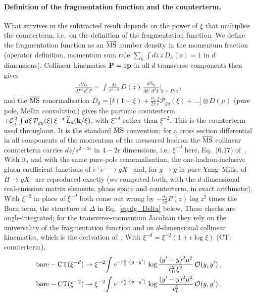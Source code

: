 \paragraph{Definition of the fragmentation function and the counterterm.} What survives in the subtracted result depends on the power of $\xi$ that multiplies the counterterm, i.e.\ on the definition of the fragmentation function. We define the fragmentation function as an $\overline{\rm MS}$ number density in the momentum fraction (operator definition, momentum sum rule $\sum_h\int dz\,z\,D_h(z)=1$ in $d$ dimensions). Collinear kinematics $\mathbf{P}=z\mathbf{p}$ in all $d$ transverse components then gives
\begin{align}
\frac{dN_h}{dP^+d^dP}=\int\frac{dz}{z^{1+d}}\,D(z)\,\frac{dN_g}{dk^+d^dk}\bigg|_{k=P/z}\,,
\end{align}
and the $\overline{\rm MS}$ renormalisation $D_0=\big[\delta(1-\xi)+\frac{\alpha_s}{2\pi}\frac2\epsilon\mathcal P_{gg}(\xi)+\dots\big]\otimes D(\mu)$ (pure pole, Mellin convolution) gives the partonic counterterm $+\mathcal C\frac2\epsilon\int d\xi\,\mathcal P_{gg}(\xi)\,\xi^{-d}\,\widehat L_d(\mathbf{k}/\xi)$, with $\xi^{-d}$ rather than $\xi^{-2}$. This is the counterterm used throughout. It is the standard $\overline{\rm MS}$ convention: for a cross section differential in all components of the momentum of the measured hadron the $\overline{\rm MS}$ collinear counterterm carries $dz/z^{2-2\epsilon}$ in $4-2\epsilon$ dimensions, i.e.\ $\xi^{-d}$ here, Eq.~(6.17) of~\cite{Catani:1996vz}. With it, and with the same pure-pole renormalisation, the one-hadron-inclusive gluon coefficient functions of $e^+e^-\to gX$~\cite{Altarelli:1979kv,Kretzer:2000yf} and, for $g\to g$ in pure Yang--Mills, of $H\to gX$~\cite{Almasy:2011eq} are reproduced exactly (we computed both, with the $d$-dimensional real-emission matrix elements, phase space and counterterm, in exact arithmetic). With $\xi^{-2}$ in place of $\xi^{-d}$ both come out wrong by $-\frac{\alpha_s}{2\pi}P(z)\log z^2$ times the Born term, the structure of $\Delta$ in Eq.~\eqref{eq:dg_Delta} below. These checks are angle-integrated; for the transverse-momentum Jacobian they rely on the universality of the fragmentation function and on $d$-dimensional collinear kinematics, which is the derivation of~\cite{Catani:1996vz}. With $\xi^{-d}=\xi^{-2}(1+\epsilon\log\xi)$ (CT: counterterm),
\begin{align}\label{eq:dg_two}
\text{bare}-\text{CT}(\xi^{-d})&\to\xi^{-2}\!\int e^{-i\frac{k}{\xi}\cdot(y-y')}\,\log\frac{(y'-y)^2\mu^2}{c_0^2\,\xi^2}\,\mathcal O(y,y')\,,\notag\\
\text{bare}-\text{CT}(\xi^{-2})&\to\xi^{-2}\!\int e^{-i\frac{k}{\xi}\cdot(y-y')}\,\log\frac{(y'-y)^2\mu^2}{c_0^2}\,\mathcal O(y,y')\,.
\end{align}
